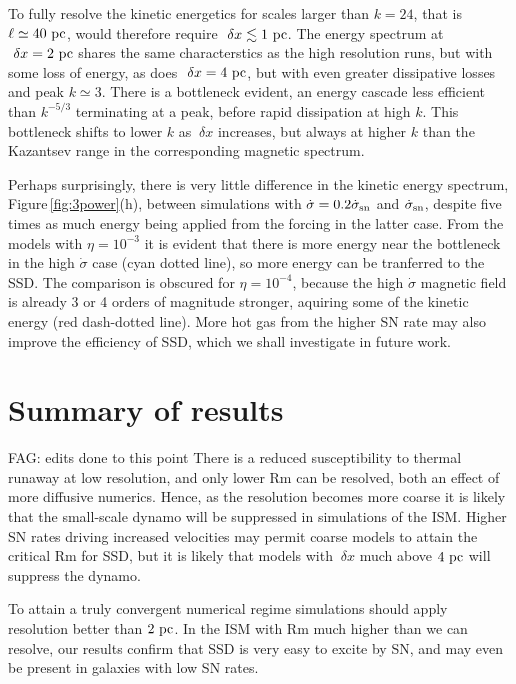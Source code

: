 \documentclass[preprint2]{aastex63}
\newcommand\SNr{\dot\sigma_{\rm sn}}
\newcommand\pc{~ {\rm pc}}
\newcommand\dx{~ {\delta x}}
\newcommand{\fag}[1]{\textcolor{midgreen}{FAG: #1}}
\begin{document}
To fully resolve the kinetic energetics for scales larger than $k=24$, that is
$\ell\simeq40\pc$, would therefore require $\dx\lesssim1\pc$.
The energy spectrum at $\dx=2\pc$ shares the same characterstics as the high
resolution runs, but with some loss of energy, as does $\dx=4\pc$, but with 
even greater dissipative losses and peak $k\simeq3$.
There is a bottleneck evident, an energy cascade less efficient than $k^{-5/3}$
terminating at a peak, before rapid dissipation at high $k$.
This bottleneck shifts to lower $k$ as $\dx$ increases, but always at higher
$k$ than the Kazantsev range in the corresponding magnetic spectrum.

Perhaps surprisingly, there is very little difference in the kinetic energy
spectrum, Figure\,\ref{fig:3power}(h), between simulations with
$\dot\sigma=0.2\SNr$ and $\SNr$, despite five times as much energy being 
applied from the forcing in the latter case.
From the models with $\eta=10^{-3}$ it is evident that there is more energy
near the bottleneck in the high $\dot\sigma$ case (cyan dotted line), so more
energy can be tranferred to the SSD.
The comparison is obscured for $\eta=10^{-4}$, because the high $\dot\sigma$
magnetic field is already 3 or 4 orders of magnitude stronger, aquiring some of
the kinetic energy (red dash-dotted line).
More hot gas from the higher SN rate may also improve the efficiency of SSD,
which we shall investigate in future work.  



\section{Summary of results}\label{sec:conc}
\fag{edits done to this point}
There is a reduced susceptibility to thermal runaway at low resolution, 
and only lower Rm can be resolved, both an effect of more diffusive numerics.
Hence, as the resolution becomes more coarse it is likely that the small-scale 
dynamo will be suppressed in simulations of the ISM.
Higher SN rates driving increased velocities may permit coarse models 
to attain the critical Rm for SSD, but it is likely that models with 
$\dx$ much above $4\pc$ will suppress the dynamo. 

To attain a truly convergent numerical regime simulations should apply 
resolution better than $2\pc$.
In the ISM with Rm much higher than we can resolve, our results confirm that
SSD is very easy to excite by SN, and may even be present in galaxies with
low SN rates.
\end{document}
